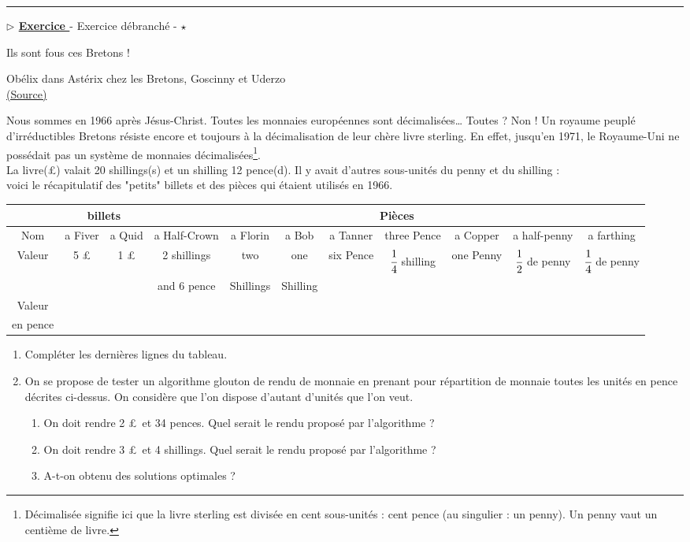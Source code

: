 \documentclass[12pt,french]{article}
\newcounter{npb}
\newcommand{\exo}{
    \stepcounter{npb}
    {\textbf{$\triangleright$ \underline{Exercice \arabic{npb} }}}
}
\begin{document}
\hrule
\medskip
\exo - Exercice débranché - $\star$ 
\begin{center}
\og Ils sont fous ces Bretons ! \fg
\end{center}
\begin{flushright}
Obélix dans Astérix chez les Bretons, Goscinny et Uderzo\\
\href{https://omnilogie.fr/O/Livre,\_shilling,\_penny...\_le\_syst\%C3\%A8me\_mon\%C3\%A9taire\_anglais\_avant\_la\_d\%C3\%A9cimalisation}{(Source)}
\end{flushright}
Nous sommes en 1966 après Jésus-Christ. Toutes les monnaies européennes sont décimalisées… Toutes ? Non ! Un royaume peuplé d'irréductibles Bretons résiste encore et toujours à la décimalisation de leur chère livre sterling. En effet, jusqu'en 1971, le Royaume-Uni ne possédait pas un système de monnaies décimalisées\footnote{Décimalisée signifie ici que la livre sterling est divisée en cent sous-unités : cent pence (au singulier : un penny). Un penny vaut un centième de livre.}. \\
La livre(\pounds) valait 20 shillings(s) et un shilling 12 pence(d). Il y avait d'autres sous-unités du penny et du shilling :\\
voici le récapitulatif des "petits" billets et des pièces qui étaient utilisés en 1966.
\footnotesize
\begin{center}
\begin{tabular}{|c|c|c|c|c|c|c|c|c|c|c|}
	\hline
	&\multicolumn{2}{c}{billets}&\multicolumn{8}{|c|}{Pièces}\\
	\hline
	Nom&a Fiver&a Quid&a Half-Crown&a Florin&a Bob&a Tanner&three Pence&a Copper&a half-penny&a farthing\\
	\hline
Valeur&5 \pounds&1 \pounds&2 shillings &two &one&six Pence&$\cfrac 1 4 $ shilling&one Penny&$\cfrac 1 2$ de penny&$\cfrac 1 4$ de penny\\
&&& and 6 pence&Shillings& Shilling&&&&&\\
\hline
Valeur&&&&&&&&&&\\
 en pence&&&&&&&&&&\\
\hline
\end{tabular}
\end{center}
\normalsize
\begin{enumerate}
	\item Compléter les dernières lignes du tableau.
	\item On se propose de tester un algorithme glouton de rendu de monnaie en prenant pour répartition de monnaie toutes les unités en pence décrites ci-dessus. On considère que l'on dispose d'autant d'unités que l'on veut.
		\begin{enumerate} 
		\item On doit rendre 2 \pounds\, et 34 pences. Quel serait le rendu proposé par l'algorithme ?
		
		\item On doit rendre 3 \pounds\, et 4 shillings. Quel serait le rendu proposé par l'algorithme ?
		\item A-t-on obtenu des solutions optimales ?
		\end{enumerate}
  
\end{enumerate} 
\end{document}
